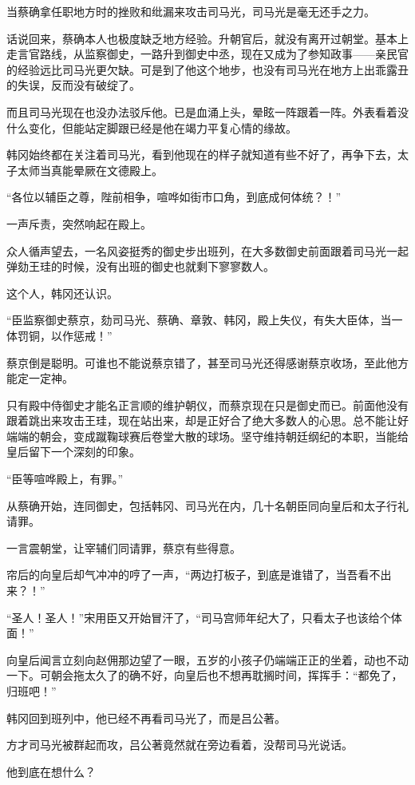 当蔡确拿任职地方时的挫败和纰漏来攻击司马光，司马光是毫无还手之力。 

话说回来，蔡确本人也极度缺乏地方经验。升朝官后，就没有离开过朝堂。基本上走言官路线，从监察御史，一路升到御史中丞，现在又成为了参知政事——亲民官的经验远比司马光更欠缺。可是到了他这个地步，也没有司马光在地方上出乖露丑的失误，反而没有破绽了。

而且司马光现在也没办法驳斥他。已是血涌上头，晕眩一阵跟着一阵。外表看着没什么变化，但能站定脚跟已经是他在竭力平复心情的缘故。 

韩冈始终都在关注着司马光，看到他现在的样子就知道有些不好了，再争下去，太子太师当真能晕厥在文德殿上。 

“各位以辅臣之尊，陛前相争，喧哗如街市口角，到底成何体统？！” 

一声斥责，突然响起在殿上。 

众人循声望去，一名风姿挺秀的御史步出班列，在大多数御史前面跟着司马光一起弹劾王珪的时候，没有出班的御史也就剩下寥寥数人。 

这个人，韩冈还认识。 

“臣监察御史蔡京，劾司马光、蔡确、章敦、韩冈，殿上失仪，有失大臣体，当一体罚铜，以作惩戒！” 

蔡京倒是聪明。可谁也不能说蔡京错了，甚至司马光还得感谢蔡京收场，至此他方能定一定神。 

只有殿中侍御史才能名正言顺的维护朝仪，而蔡京现在只是御史而已。前面他没有跟着跳出来攻击王珪，现在站出来，却是正好合了绝大多数人的心思。总不能让好端端的朝会，变成蹴鞠球赛后卷堂大散的球场。坚守维持朝廷纲纪的本职，当能给皇后留下一个深刻的印象。

“臣等喧哗殿上，有罪。” 

从蔡确开始，连同御史，包括韩冈、司马光在内，几十名朝臣同向皇后和太子行礼请罪。 

一言震朝堂，让宰辅们同请罪，蔡京有些得意。 

帘后的向皇后却气冲冲的哼了一声，“两边打板子，到底是谁错了，当吾看不出来？！” 

“圣人！圣人！”宋用臣又开始冒汗了，“司马宫师年纪大了，只看太子也该给个体面！” 

向皇后闻言立刻向赵佣那边望了一眼，五岁的小孩子仍端端正正的坐着，动也不动一下。可朝会拖太久了的确不好，向皇后也不想再耽搁时间，挥挥手：“都免了，归班吧！” 

韩冈回到班列中，他已经不再看司马光了，而是吕公著。 

方才司马光被群起而攻，吕公著竟然就在旁边看着，没帮司马光说话。 

他到底在想什么？ 

